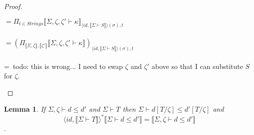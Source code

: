 \documentclass{article}
\newtheorem{lemma}{Lemma}
\newcommand{\sem}[1]{\llbracket #1 \rrbracket}
\begin{document}
\begin{proof}
\begin{description}
$= \Pi_{t \in \mathit{Strings}} \sem{\Sigma,\zeta,\zeta' \vdash \kappa}_{\langle \mathit{id}, \sem{\Sigma \vdash S} \rangle(\sigma),t}$\\~\\
$= (\Pi_{\sem{\Sigma,\zeta},\sem{\zeta'}} \sem{\Sigma,\zeta,\zeta' \vdash \kappa} )_{\langle \mathit{id}, \sem{\Sigma \vdash S} \rangle(\sigma),t}$\\~\\
=~todo: this is wrong... I need to swap $\zeta$ and $\zeta'$ above so that I can substitute $S$ for $\zeta$.

\end{description}
\end{proof}

\begin{lemma}
If $\Sigma,\zeta \vdash d \leq d'$ and $\Sigma \vdash T$ then $\Sigma \vdash d[T/\zeta] \leq d'[T/\zeta]$ and 
$$\langle \mathit{id}, \sem{\Sigma \vdash T} \rangle^* \sem{\Sigma \vdash d \leq d'} = \sem{\Sigma,\zeta \vdash d \leq d'}$$.
\label{SD-Subst}
\end{lemma}
\end{document}
